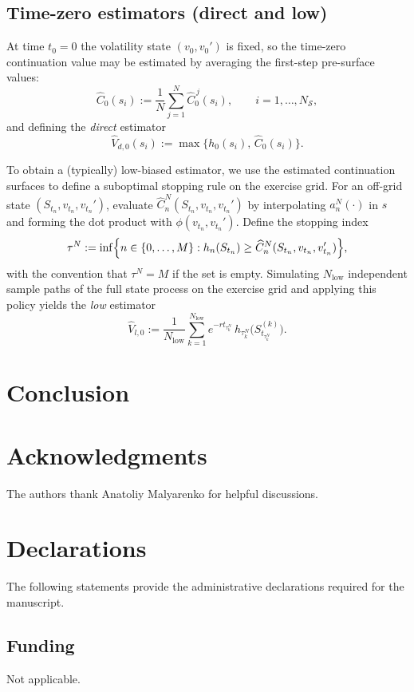 \documentclass[10pt]{article}
\theoremstyle{plain}
\theoremstyle{definition}
\theoremstyle{remark}
\begin{document}
\subsection{Time-zero estimators (direct and low)}
At time $t_0=0$ the volatility state $(v_0,v_0')$ is fixed, so the time-zero continuation value may be estimated by averaging the first-step
pre-surface values:
\[
\widehat C_0(s_i):=\frac1N\sum_{j=1}^N \widehat C_0^{\,j}(s_i),
\qquad i=1,\dots,N_{\mathcal S},
\]
and defining the \emph{direct} estimator
\[
\widehat V_{d,0}(s_i) := \max\{h_0(s_i),\,\widehat C_0(s_i)\}.
\]


To obtain a (typically) low-biased estimator, we use the estimated continuation surfaces to define a suboptimal stopping rule on the exercise
grid. For an off-grid state $(S_{t_n},v_{t_n},v_{t_n}')$, evaluate $\widehat C_n^{N}(S_{t_n},v_{t_n},v_{t_n}')$ by interpolating $a_n^{N}(\cdot)$
in $s$ and forming the dot product with $\phi(v_{t_n},v_{t_n}')$. Define the stopping index
\[
\tau^{N} := \inf\Bigl\{n\in\{0,\dots,M\}: h_n(S_{t_n}) \ge \widehat C_n^{N}(S_{t_n},v_{t_n},v_{t_n}')\Bigr\},
\]
with the convention that $\tau^{N}=M$ if the set is empty. Simulating $N_{\mathrm{low}}$ independent sample paths of the full state process on
the exercise grid and applying this policy yields the \emph{low} estimator
\[
\widehat V_{l,0} := \frac1{N_{\mathrm{low}}}\sum_{k=1}^{N_{\mathrm{low}}} e^{-r t_{\tau_k^{N}}}\,h_{\tau_k^{N}}\bigl(S_{t_{\tau_k^{N}}}^{(k)}\bigr).
\]



\section{Conclusion}\label{sec:conclusion}



\section*{Acknowledgments}
The authors thank Anatoliy Malyarenko for helpful discussions.

\section*{Declarations}

The following statements provide the administrative declarations required for the manuscript.

\subsection*{Funding}
Not applicable.
\end{document}
